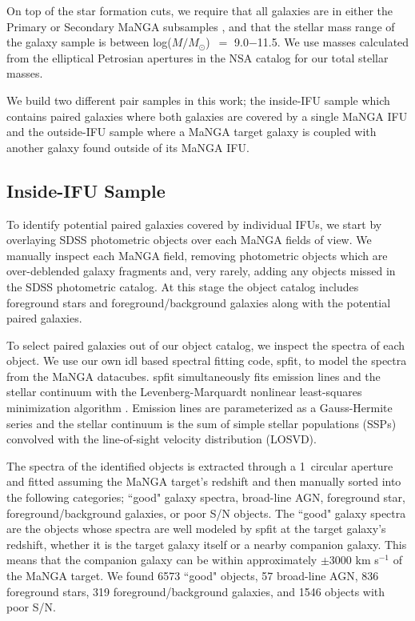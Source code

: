 \documentclass[iop,revtex4,twocolumn,apj,numberedappendix,appendixfloats]{emulateapj}
\newcommand{\logm}{log($M/M_{\odot}$)}
\begin{document}
On top of the star formation cuts, we require that all galaxies are in either the Primary or Secondary MaNGA subsamples \citep{Wake:2017}, and that the stellar mass range of the galaxy sample is between \logm\ $=$ 9.0$-$11.5. We use masses calculated from the elliptical Petrosian apertures in the NSA catalog for our total stellar masses. 

We build two different pair samples in this work; the inside-IFU sample which contains paired galaxies where both galaxies are covered by a single MaNGA IFU and the outside-IFU sample where a MaNGA target galaxy is coupled with another galaxy found outside of its MaNGA IFU. 

\subsection{Inside-IFU Sample}\label{sec:inside}

To identify potential paired galaxies covered by individual IFUs, we start by overlaying SDSS photometric objects over each MaNGA fields of view. We manually inspect each MaNGA field, removing photometric objects which are over-deblended galaxy fragments and, very rarely, adding any objects missed in the SDSS photometric catalog. At this stage the object catalog includes foreground stars and foreground/background galaxies along with the potential paired galaxies. 

To select paired galaxies out of our object catalog, we inspect the spectra of each object. We use our own {\sc idl} based spectral fitting code, {\sc spfit}, to model the spectra from the MaNGA datacubes. {\sc spfit} simultaneously fits emission lines and the stellar continuum with the Levenberg-Marquardt nonlinear least-squares minimization algorithm . Emission lines are parameterized as a Gauss-Hermite series and the stellar continuum is the sum of simple stellar populations (SSPs) convolved with the line-of-sight velocity distribution (LOSVD).

The spectra of the identified objects is extracted through a 1\arcsec\ circular aperture and fitted assuming the MaNGA target's redshift and then manually sorted into the following categories; ``good" galaxy spectra, broad-line AGN, foreground star, foreground/background galaxies, or poor S/N objects. The ``good" galaxy spectra are the objects whose spectra are well modeled by {\sc spfit} at the target galaxy's redshift, whether it is the target galaxy itself or a nearby companion galaxy. This means that the companion galaxy can be within approximately $\pm$3000 km s$^{-1}$ of the MaNGA target. We found 6573 ``good" objects, 57 broad-line AGN, 836 foreground stars, 319 foreground/background galaxies, and 1546 objects with poor S/N. 
\end{document}
